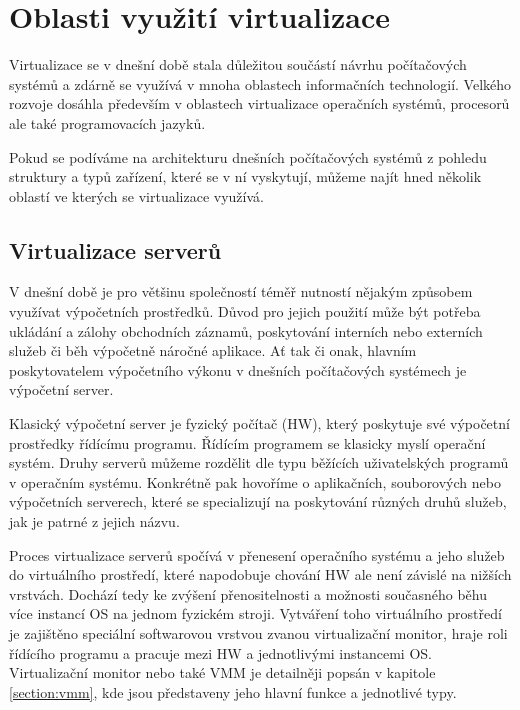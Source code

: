 \section{Oblasti využití virtualizace}
\label{section:virtualization_domains}

Virtualizace se v dnešní době stala důležitou součástí návrhu počítačových systémů a zdárně se využívá v mnoha oblastech informačních technologií. Velkého rozvoje dosáhla především v oblastech virtualizace operačních
systémů, procesorů ale také programovacích jazyků.

Pokud se podíváme na architekturu dnešních počítačových systémů z pohledu struktury a typů zařízení, které se v ní vyskytují, můžeme najít hned několik oblastí ve kterých se virtualizace využívá. 

  \subsection{Virtualizace serverů}
  \label{subsection:server_virtualization}
  
  V dnešní době je pro většinu společností téměř nutností nějakým způsobem využívat výpočetních prostředků. Důvod pro jejich použití může být potřeba ukládání a zálohy obchodních záznamů, poskytování interních nebo
  externích služeb či běh výpočetně náročné aplikace. Ať tak či onak, hlavním poskytovatelem výpočetního výkonu v dnešních počítačových systémech je výpočetní server.
  
  Klasický výpočetní server je fyzický počítač (HW), který poskytuje své výpočetní prostředky řídícímu programu. Řídícím programem se klasicky myslí operační systém. Druhy serverů můžeme rozdělit dle typu běžících
  uživatelských programů v operačním systému. Konkrétně pak hovoříme o aplikačních, souborových nebo výpočetních serverech, které se specializují na poskytování různých druhů služeb, jak je patrné z jejich názvu.
  
  Proces virtualizace serverů spočívá v přenesení operačního systému a jeho služeb do virtuálního prostředí, které napodobuje chování HW ale není závislé na nižších vrstvách. Dochází tedy ke zvýšení přenositelnosti a
  možnosti současného běhu více instancí OS na jednom fyzickém stroji. Vytváření toho virtuálního prostředí je zajištěno speciální softwarovou vrstvou zvanou virtualizační monitor, hraje roli řídícího programu a
  pracuje mezi HW a jednotlivými instancemi OS. Virtualizační monitor nebo také VMM je detailněji popsán v kapitole \ref{section:vmm}, kde jsou představeny jeho hlavní funkce a jednotlivé typy.
  
